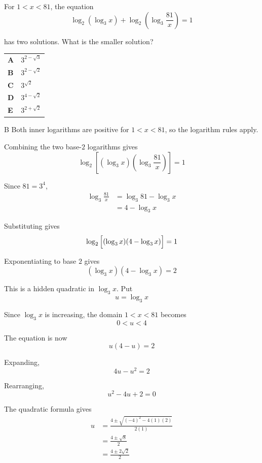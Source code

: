 \documentclass[11pt,a4paper]{article}
\begin{document}
\begin{enumerate}[label=\textbf{\arabic*.},leftmargin=*,itemsep=0pt,start=3]
For $1<x<81$, the equation
\[\log_2(\log_3 x)+\log_2\!\left(\log_3\frac{81}{x}\right)=1\]

has two solutions. What is the smaller solution?

\par\vspace*{12pt}
\begin{tabularx}{\linewidth}{@{}>{\bfseries}l Y@{}}
A &
$3^{2-\sqrt{3}}$
\\[0.8em]
B &
$3^{2-\sqrt{2}}$
\\[0.8em]
C &
$3^{\sqrt{2}}$
\\[0.8em]
D &
$3^{4-\sqrt{2}}$
\\[0.8em]
E &
$3^{2+\sqrt{2}}$
\\
\end{tabularx}

\begin{djsSolution}{B}
Both inner logarithms are positive for $1<x<81$, so the logarithm rules apply.

Combining the two base-$2$ logarithms gives
\[
\log_2\!\left[(\log_3 x)\left(\log_3\frac{81}{x}\right)\right]=1
\]

Since $81=3^4$,
\[
\begin{aligned}
\log_3\frac{81}{x}
&=\log_3 81-\log_3 x\\[5pt]
&=4-\log_3 x
\end{aligned}
\]

Substituting gives
\[
\log_2\,\Bigl[(\log_3 x)(4-\log_3 x)\Bigr]=1
\]

Exponentiating to base $2$ gives
\[
(\log_3 x)(4-\log_3 x)=2
\]

This is a hidden quadratic in $\log_3 x$. Put
\[
u=\log_3 x
\]

Since $\log_3 x$ is increasing, the domain $1<x<81$ becomes
\[
0<u<4
\]

The equation is now
\[
u(4-u)=2
\]

Expanding,
\[
4u-u^2=2
\]

Rearranging,
\[
u^2-4u+2=0
\]

The quadratic formula gives
\[
\begin{aligned}
u&=\frac{4\pm\sqrt{(-4)^2-4(1)(2)}}{2(1)}\\[8pt]
&=\frac{4\pm\sqrt{8}}{2}\\[8pt]
&=\frac{4\pm2\sqrt{2}}{2}
\end{aligned}
\]


\end{djsSolution}
\end{enumerate}
\end{document}
